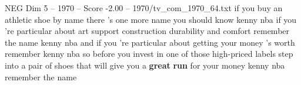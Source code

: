 \begin{textsample}{NEG Dim 5 – 1970 – Score -2.00 – 1970/tv\_com\_1970\_64.txt}  \label{ex:f5_neg_060}
if you buy an athletic shoe by name there 's one more name you should know kenny nba if you 're particular about art support construction durability and comfort remember the name kenny nba and if you 're particular about getting your money 's worth remember kenny nba so before you invest in one of those high-priced labels step into a pair of shoes that will give you a \textbf{great} \textbf{run} for your money kenny nba remember the name

\end{textsample}
